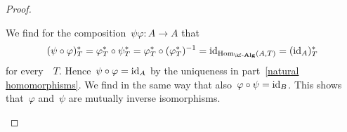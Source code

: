 \begin{proof}
\begin{enumerate}
      We find for the composition~$\psi \varphi \colon A \to A$ that
      \[
        (\psi \circ \varphi)^*_T
        =
        \varphi^*_T \circ \psi^*_T
        =
        \varphi^*_T \circ (\varphi^*_T)^{-1}
        =
        \id_{\Hom_{\cAlg{\kf}}(A,T)}
        =
        (\id_A)^*_T
      \]
      for every~{\algebra{$\kf$}}~$T$.
      Hence~$\psi \circ \varphi = \mathrm{id}_A$ by the uniqueness in part~\ref*{natural homomorphisms}.
      We find in the same way that also~$\varphi \circ \psi = \mathrm{id}_B$.
      This shows that~$\varphi$ and~$\psi$ are mutually inverse isomorphisms.
    \qedhere
  \end{enumerate}
\end{proof}


